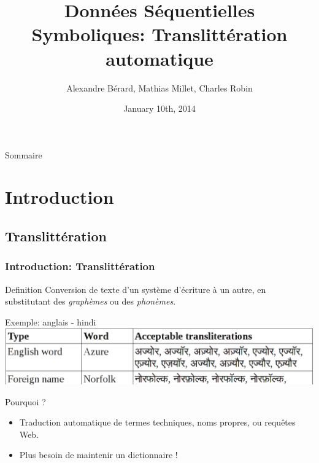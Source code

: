 \documentclass{beamer}
\title[Translittération automatique]{Données Séquentielles Symboliques: Translittération automatique}
\author[A.~Bérard, M.~Millet, C.~Robin]{Alexandre Bérard, Mathias Millet, Charles Robin}
\date{January 10th, 2014}
\begin{document}
\begin{frame}
\titlepage
\end{frame}

\begin{frame}{Sommaire}
  \tableofcontents
\end{frame}

\section{Introduction}   
 
\subsection{Translittération}
\begin{frame}
    \frametitle{Introduction: Translittération}
	\begin{block}{Definition}
        Conversion de texte d'un système d'écriture à un autre, en substitutant des \emph{graphèmes} ou des \emph{phonèmes}.
    \end{block}	    
    
	\begin{exampleblock}{Exemple: anglais - hindi}
	\includegraphics[scale=0.2]{en-in-example}
    \end{exampleblock}
    
	\begin{block}{Pourquoi ?}
	\begin{itemize}
		\item Traduction automatique de termes techniques, noms propres, ou requêtes Web.
		\item Plus besoin de maintenir un dictionnaire !
	\end{itemize}
	\end{block}	    
\end{frame}
\end{document}
